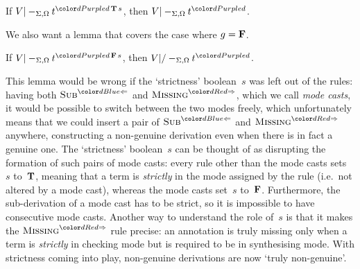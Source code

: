 \begin{lemma}\label{thm:Pre?-true}
If\/ $V |-_{\Sigma,\Omega} t^{\dir{d}\,\BTrue\,s}$, then $V |-_{\Sigma,\Omega} t^\dir{d}$.
\end{lemma}


We also want a lemma that covers the case where $g = \mathbf{F}$.

\begin{lemma}\label{thm:Pre?-false}
If\/ $V |-_{\Sigma,\Omega} t^{\dir{d}\,\BFalse\,s}$, then $V |/-_{\Sigma,\Omega} t^\dir{d}$.
\end{lemma}

This lemma would be wrong if the `strictness' boolean~$s$ was left out of the rules: having both $\ChkRule{Sub}$ and $\SynRule{Missing}$, which we call \emph{mode casts}, it would be possible to switch between the two modes freely, which unfortunately means that we could insert a pair of $\ChkRule{Sub}$ and $\SynRule{Missing}$ anywhere, constructing a non-genuine derivation even when there is in fact a genuine one.
The `strictness' boolean~$s$ can be thought of as disrupting the formation of such pairs of mode casts: every rule other than the mode casts sets~$s$ to~$\mathbf{T}$, meaning that a term is \emph{strictly} in the mode assigned by the rule (i.e.~not altered by a mode cast), whereas the mode casts set~$s$ to~$\mathbf{F}$.
Furthermore, the sub-derivation of a mode cast has to be strict, so it is impossible to have consecutive mode casts.
Another way to understand the role of~$s$ is that it makes the $\SynRule{Missing}$ rule precise: an annotation is truly missing only when a term is \emph{strictly} in checking mode but is required to be in synthesising mode.
With strictness coming into play, non-genuine derivations are now `truly non-genuine'.

